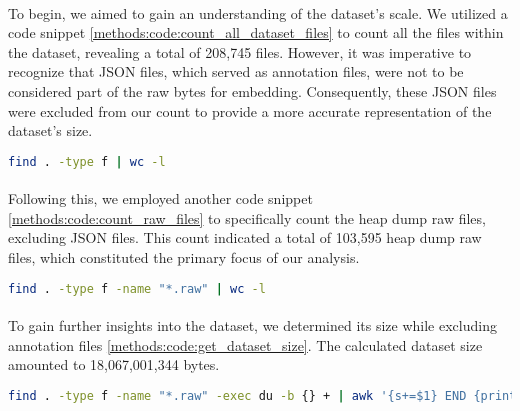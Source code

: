             \paragraph{}To begin, we aimed to gain an understanding of the dataset's scale. We utilized a code snippet \ref{methods:code:count_all_dataset_files} to count all the files within the dataset, revealing a total of 208,745 files. However, it was imperative to recognize that JSON files, which served as annotation files, were not to be considered part of the raw bytes for embedding. Consequently, these JSON files were excluded from our count to provide a more accurate representation of the dataset's size.

            \begin{lstlisting}[caption={Count all dataset files}, label=methods:code:count_all_dataset_files, language=bash]
            find . -type f | wc -l
            \end{lstlisting}

            \paragraph{}Following this, we employed another code snippet \ref{methods:code:count_raw_files} to specifically count the heap dump raw files, excluding JSON files. This count indicated a total of 103,595 heap dump raw files, which constituted the primary focus of our analysis.

            \begin{lstlisting}[caption={Count heap dump raw dataset files}, label=methods:code:count_raw_files, language=bash]
            find . -type f -name "*.raw" | wc -l
            \end{lstlisting}

            \paragraph*{}To gain further insights into the dataset, we determined its size while excluding annotation files \ref{methods:code:get_dataset_size}. The calculated dataset size amounted to 18,067,001,344 bytes.

            \begin{lstlisting}[caption={Get the size of the dataset}, label=methods:code:get_dataset_size, language=bash]
            find . -type f -name "*.raw" -exec du -b {} + | awk '{s+=$1} END {print s}'
            \end{lstlisting}

